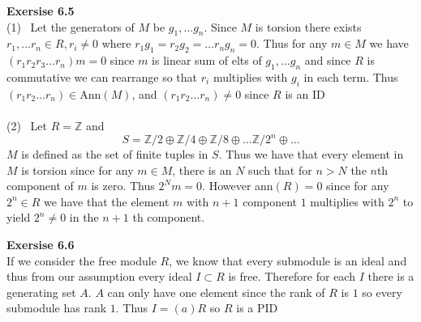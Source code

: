 \documentclass[12pt]{article}
\newenvironment{ques}[1]{\textbf{Exersise #1}\vspace{1 mm}\\ }{\bigskip}
\theoremstyle{definition}
\newcommand{\Z}{\mathbb Z}
\begin{document}
\begin{ques}{6.5}
	(1) \ Let the generators of $M$ be $g_1, \dots g_n$. Since $M$ is torsion
	there exists $r_1, \dots r_n \in R, r_i \neq 0$ where $r_1g_1 = r_2g_2 = \dots
	r_ng_n = 0$.  Thus for any $m \in M$ we have $(r_1r_2r_3 \dots r_n)m = 0$
	since $m$ is linear sum of elts of $g_1, \dots g_n$ and since $R$ is
	commutative we can rearrange so that $r_i$ multiplies with $g_i$ in each
	term. Thus $(r_1r_2 \dots r_n) \in \text{Ann}(M)$, and $(r_1r_2 \dots r_n)
	\neq 0$ since $R$ is an ID\\
	\\
	(2) \ Let $R = \Z$ and 
	$$S = \Z/2 \oplus \Z/4 \oplus \Z/8 \oplus \dots \Z/2^n \oplus \dots$$
	$M$ is defined as the set of finite tuples in $S$.  Thus we have that every
	element in $M$ is torsion since for any $m \in M$, there is an $N$ such
	that for $n > N$ the $n$th component of $m$ is zero. Thus $2^Nm = 0$.
	However ann$(R) = 0$ since for any $2^n \in R$ we have that the element $m$
	with $n+1$ component $1$ multiplies with $2^n$ to yield $2^n \neq 0$ in the
	$n+1$ th component. 
\end{ques}

\begin{ques}{6.6}
	If we consider the free module $R$, we know that every submodule is an
	ideal and thus from our assumption every ideal $I \subset R$ is free.
	Therefore for each $I$ there is a generating set $A$. $A$ can only have one
	element since the rank of $R$ is $1$ so every submodule has rank $1$. Thus
	$I = (a)R$ so $R$ is a PID
\end{ques}
\end{document}
